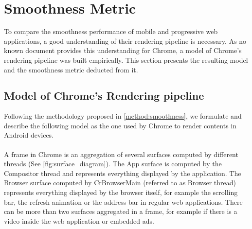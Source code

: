 \documentclass{kththesis}
\begin{document}






\section{Smoothness Metric}


To compare the smoothness performance of mobile and progressive web applications, a good understanding of their rendering pipeline is necessary. As no known document provides this understanding for Chrome, a model of Chrome's rendering pipeline was built empirically. This section presents the resulting model and the smoothness metric deducted from it. 

\subsection{Model of Chrome's Rendering pipeline}
\label{results:chrome_model}

Following the methodology proposed in \autoref{method:smoothness}, we formulate and describe the following model as the one used by Chrome to render contents in Android devices.

\paragraph{}
A frame in Chrome is an aggregation of several surfaces computed by different threads (See \autoref{fig:surface_diagram}). The App surface is computed by the Compositor thread and represents everything displayed by the application. The Browser surface computed by CrBrowserMain (referred to as Browser thread) represents everything displayed by the browser itself, for example the scrolling bar, the refresh animation or the address bar in regular web applications. There can be more than two surfaces aggregated in a frame, for example if there is a video inside the web application or embedded ads.
\end{document}

